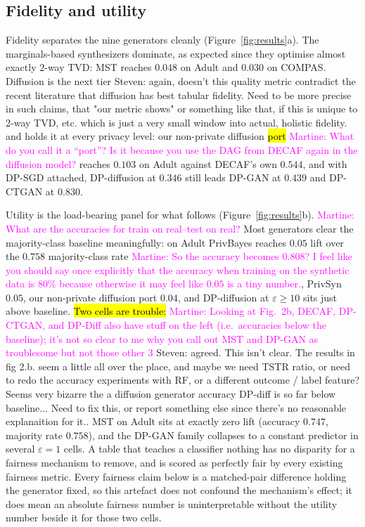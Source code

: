 \documentclass{article}
\newcommand{\martine}[1]{\textcolor{magenta}{Martine: #1}}
\newcommand{\s}[1]{\textcolor{Dandelion}{Steven: #1}}
\begin{document}
\subsection{Fidelity and utility}

Fidelity separates the nine generators cleanly (Figure~\ref{fig:results}a).
The marginals-based synthesizers dominate, as expected since they optimise
almost exactly $2$-way TVD: MST reaches $0.048$ on Adult and $0.030$ on
COMPAS. Diffusion is the next tier \s{again, doesn't this quality metric contradict the recent literature that diffusion has best tabular fidelity. Need to be more precise in such claims, that "our metric shows" or something like that, if this is unique to 2-way TVD, etc. which is just a very small window into actual, holistic fidelity.} and holds it at every privacy level: our
non-private diffusion \hl{port} \martine{What do you call it a ``port''? Is it because you use the DAG from DECAF again in the diffusion model?} reaches $0.103$ on Adult against DECAF's own
$0.544$, and with DP-SGD attached, DP-diffusion at $0.346$ still leads
DP-GAN at $0.439$ and DP-CTGAN at $0.830$.

Utility is the load-bearing panel for what follows (Figure~\ref{fig:results}b). \martine{What are the accuracies for train on real--test on real?}
Most generators clear the majority-class baseline meaningfully: on Adult
PrivBayes reaches $0.05$ lift over the $0.758$ majority-class rate \martine{So the accuracy becomes 0.808? I feel like you should say once explicitly that the accuracy when training on the synthetic data is 80\% because otherwise it may feel like $0.05$ is a tiny number.}, PrivSyn
$0.05$, our non-private diffusion port $0.04$, and DP-diffusion at
$\varepsilon\geq10$ sits just above baseline. \hl{Two cells are trouble:} \martine{Looking at Fig.~2b, DECAF, DP-CTGAN, and DP-Diff also have stuff on the left (i.e.~accuracies below the baseline); it's not so clear to me why you call out MST and DP-GAN as troublesome but not those other 3} \s{agreed. This isn't clear. The results in fig 2.b. seem a little all over the place, and maybe we need TSTR ratio, or need to redo the accuracy experiments with RF, or a different outcome / label feature? Seems very bizarre the a diffusion generator accuracy DP-diff is so far below baseline... Need to fix this, or report something else since there's no reasonable explanaition for it..} MST on
Adult sits at exactly zero lift (accuracy $0.747$, majority rate $0.758$),
and the DP-GAN family collapses to a constant predictor in several
$\varepsilon{=}1$ cells. A table that teaches a classifier nothing has no
disparity for a fairness mechanism to remove, and is scored as perfectly
fair by every existing fairness metric. Every fairness claim below is a
matched-pair difference holding the generator fixed, so this artefact does not
confound the mechanism's effect; it does mean an absolute fairness number is
uninterpretable without the utility number beside it for those two cells.
\end{document}
